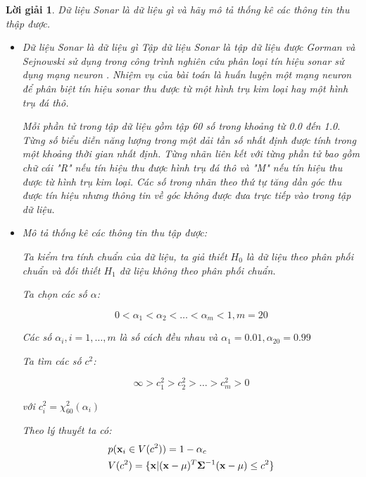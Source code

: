 \documentclass[14pt, a4paper]{article}
\theoremstyle{sltheorem}
\theoremstyle{soltheorem}
\newtheorem*{loigiai}{Lời giải}
\begin{document}
\begin{loigiai}
    Dữ liệu Sonar là dữ liệu gì và hãy mô tả thống kê các thông tin thu thập được.
    \begin{itemize}
        \item Dữ liệu Sonar là dữ liệu gì
        Tập dữ liệu Sonar là tập dữ liệu được Gorman và Sejnowski sử dụng trong công trình nghiên cứu phân loại tín hiệu sonar sử dụng mạng neuron \cite{gorman1988analysis}.
        Nhiệm vụ của bài toán là huấn luyện một mạng neuron để phân biệt tín hiệu sonar thu được từ một hình trụ kim loại hay một hình trụ đá thô.
        
        Mỗi phần tử trong tập dữ liệu gồm tập 60 số trong khoảng từ 0.0 đến 1.0.
        Từng số biểu diễn năng lượng trong một dải tần số nhất định được tính trong một khoảng thời gian nhất định. 
        Từng nhãn liên kết với từng phần tử bao gồm chữ cái "R" nếu tín hiệu thu được hình trụ đá thô và "M" nếu tín hiệu thu được từ hình trụ kim loại.
        Các số trong nhãn theo thứ tự tăng dần góc thu được tín hiệu nhưng thông tin về góc không được đưa trực tiếp vào trong tập dữ liệu.
        \item Mô tả thống kê các thông tin thu tập được:
        
        Ta kiểm tra tính chuẩn của dữ liệu, ta giả thiết $H_0$ là dữ liệu theo phân phối chuẩn và đối thiết $H_1$ dữ liệu không theo phân phối chuẩn.

        Ta chọn các số $\alpha$:

        \begin{equation*}
            0 < \alpha_1 < \alpha_2 < \dots < \alpha_m < 1, m = 20
        \end{equation*}

        Các số $\alpha_i, i = 1,\dots,m$ là số cách đều nhau và $\alpha_1=0.01, \alpha_{20}=0.99$

        Ta tìm các số $c^2$:

        \begin{equation*}
            \infty > c_1^2 > c_2^2 > \dots > c_m^2 > 0
        \end{equation*}

        với $c_i^2 = \chi_{60}^2 (\alpha_i)$

        Theo lý thuyết ta có:
        \begin{equation*}
            \begin{aligned}
                &p(\bold{x}_i \in V(c^2)) = 1 - \alpha_c \\
                &V(c^2) = \lbrace \bold{x} \vert (\bold{x} - \bold{\mu})^T \bold{\Sigma}^{-1} (\bold{x} - \bold{\mu}) \leq c^2 \rbrace
            \end{aligned}
        \end{equation*}


\end{itemize}
\end{loigiai}
\end{document}
